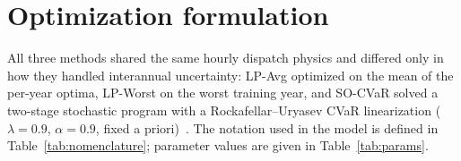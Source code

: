 \documentclass[11pt]{article}
\begin{document}
\section{Optimization formulation}\label{sec:formulation}
All three methods shared the same hourly dispatch physics and differed only in how they handled
interannual uncertainty: LP-Avg optimized on the mean of the per-year optima, LP-Worst on the worst
training year, and SO-CVaR solved a two-stage stochastic program with a Rockafellar--Uryasev CVaR
linearization ($\lambda = 0.9$, $\alpha = 0.9$, fixed a priori)~\citep{ref44}. The notation used in
the model is defined in Table~\ref{tab:nomenclature}; parameter values are given in
Table~\ref{tab:params}.
\end{document}
